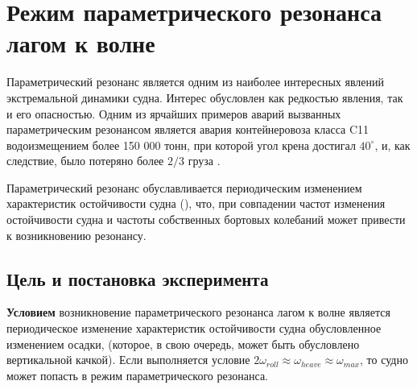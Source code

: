 \section{Режим параметрического резонанса лагом к волне}

Параметрический резонанс является одним из наиболее интересных явлений экстремальной динамики судна.
Интерес обусловлен как редкостью явления, так и его опасностью. 
Одним из ярчайших примеров аварий вызванных параметрическим резонансом является 
авария контейнеровоза класса C11 водоизмещением более 150 000 тонн, при которой 
угол крена достигал $40^{\circ}$, и, как следствие, было потеряно более $2/3$ 
груза \citep{c11}.

Параметрический резонанс обуславливается периодическим изменением характеристик остойчивости судна (), что, при совпадении частот изменения остойчивости судна  и частоты собственных 
бортовых колебаний может привести к возникновению резонансу. 



\subsection{Цель и постановка эксперимента}

\textbf{Условием} возникновение параметрического резонанса  лагом к волне является периодическое изменение характеристик остойчивости судна обусловленное изменением осадки, (которое, в свою очередь, может быть обусловлено вертикальной качкой). Если выполняется условие $2 \omega_{roll} \approx \omega_{heave} \approx \omega_{max}$, то судно может попасть в режим параметрического резонанса.

